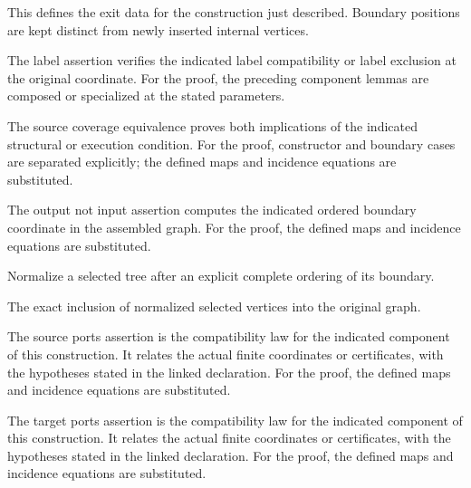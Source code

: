 This defines the exit data for the construction just described. Boundary positions are kept distinct from newly inserted internal vertices.
\par{}

The label assertion verifies the indicated label compatibility or label exclusion at the original coordinate.
For the proof, the preceding component lemmas are composed or specialized at the stated parameters.
\par{}

The source coverage equivalence proves both implications of the indicated structural or execution condition.
For the proof, constructor and boundary cases are separated explicitly; the defined maps and incidence equations are substituted.
\par{}

The output not input assertion computes the indicated ordered boundary coordinate in the assembled graph.
For the proof, the defined maps and incidence equations are substituted.
\par{}

Normalize a selected tree after an explicit complete ordering of its boundary.
\par{}

The exact inclusion of normalized selected vertices into the original graph.
\par{}

The source ports assertion is the compatibility law for the indicated component of this construction. It relates the actual finite coordinates or certificates, with the hypotheses stated in the linked declaration.
For the proof, the defined maps and incidence equations are substituted.
\par{}

The target ports assertion is the compatibility law for the indicated component of this construction. It relates the actual finite coordinates or certificates, with the hypotheses stated in the linked declaration.
For the proof, the defined maps and incidence equations are substituted.
\par{}

